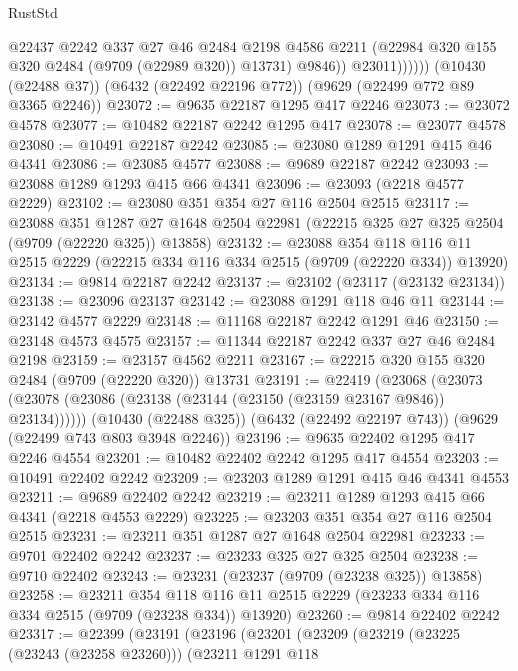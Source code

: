 \begin{lexlean}{RustStd}
\begin{coremodule}
                    @22437
                    @2242
                    @337
                    @27
                    @46
                    @2484
                    @2198
                    @4586
                    @2211
                    (@22984 @320 @155 @320 @2484 (@9709 (@22989 @320)) @13731)
                    @9846))
                @23011))))))
    (@10430 (@22488 @37))
    (@6432 (@22492 @22196 @772))
    (@9629 (@22499 @772 @89 @3365 @2246))
@23072 := @9635 @22187 @1295 @417 @2246
@23073 := @23072 @4578
@23077 := @10482 @22187 @2242 @1295 @417
@23078 := @23077 @4578
@23080 := @10491 @22187 @2242
@23085 := @23080 @1289 @1291 @415 @46 @4341
@23086 := @23085 @4577
@23088 := @9689 @22187 @2242
@23093 := @23088 @1289 @1293 @415 @66 @4341
@23096 := @23093 (@2218 @4577 @2229)
@23102 := @23080 @351 @354 @27 @116 @2504 @2515
@23117 := @23088
    @351
    @1287
    @27
    @1648
    @2504
    @22981
    (@22215 @325 @27 @325 @2504 (@9709 (@22220 @325)) @13858)
@23132 := @23088
    @354
    @118
    @116
    @11
    @2515
    @2229
    (@22215 @334 @116 @334 @2515 (@9709 (@22220 @334)) @13920)
@23134 := @9814 @22187 @2242
@23137 := @23102 (@23117 (@23132 @23134))
@23138 := @23096 @23137
@23142 := @23088 @1291 @118 @46 @11
@23144 := @23142 @4577 @2229
@23148 := @11168 @22187 @2242 @1291 @46
@23150 := @23148 @4573 @4575
@23157 := @11344 @22187 @2242 @337 @27 @46 @2484 @2198
@23159 := @23157 @4562 @2211
@23167 := @22215 @320 @155 @320 @2484 (@9709 (@22220 @320)) @13731
@23191 := @22419
    (@23068 (@23073 (@23078 (@23086 (@23138 (@23144 (@23150 (@23159 @23167 @9846)) @23134))))))
    (@10430 (@22488 @325))
    (@6432 (@22492 @22197 @743))
    (@9629 (@22499 @743 @803 @3948 @2246))
@23196 := @9635 @22402 @1295 @417 @2246 @4554
@23201 := @10482 @22402 @2242 @1295 @417 @4554
@23203 := @10491 @22402 @2242
@23209 := @23203 @1289 @1291 @415 @46 @4341 @4553
@23211 := @9689 @22402 @2242
@23219 := @23211 @1289 @1293 @415 @66 @4341 (@2218 @4553 @2229)
@23225 := @23203 @351 @354 @27 @116 @2504 @2515
@23231 := @23211 @351 @1287 @27 @1648 @2504 @22981
@23233 := @9701 @22402 @2242
@23237 := @23233 @325 @27 @325 @2504
@23238 := @9710 @22402
@23243 := @23231 (@23237 (@9709 (@23238 @325)) @13858)
@23258 := @23211
    @354
    @118
    @116
    @11
    @2515
    @2229
    (@23233 @334 @116 @334 @2515 (@9709 (@23238 @334)) @13920)
@23260 := @9814 @22402 @2242
@23317 := @22399
    (@23191
      (@23196
        (@23201
          (@23209
            (@23219
              (@23225 (@23243 (@23258 @23260)))
              (@23211
                @1291
                @118

\end{coremodule}
\end{lexlean}
